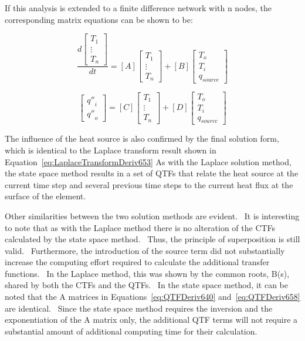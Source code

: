 If this analysis is extended to a finite difference network with n nodes, the corresponding matrix equations can be shown to be:

\begin{equation}
\frac{{d\left[ {\begin{array}{*{20}{c}}{{T_1}}\\ \vdots \\ {{T_n}}\end{array}} \right]}}{{dt}} = \left[ A \right]\left[ {\begin{array}{*{20}{c}}{{T_1}}\\ \vdots \\ {{T_n}}\end{array}} \right] + \left[ B \right]\left[ {\begin{array}{*{20}{c}}{{T_o}}\\ {{T_i}}\\ {{q_{source}}}\end{array}} \right]
\end{equation}

\begin{equation}
\left[ {\begin{array}{*{20}{c}}{{{q''}_i}}\\ {{{q''}_o}}\end{array}} \right] = \left[ C \right]\left[ {\begin{array}{*{20}{c}}{{T_1}}\\ \vdots \\ {{T_n}}\end{array}} \right] + \left[ D \right]\left[ {\begin{array}{*{20}{c}}{{T_o}}\\ {{T_i}}\\ {{q_{source}}}\end{array}} \right]
\end{equation}

The influence of the heat source is also confirmed by the final solution form, which is identical to the Laplace transform result shown in Equation~\ref{eq:LaplaceTransformDeriv653} As with the Laplace solution method, the state space method results in a set of QTFs that relate the heat source at the current time step and several previous time steps to the current heat flux at the surface of the element.

Other similarities between the two solution methods are evident.~ It is interesting to note that as with the Laplace method there is no alteration of the CTFs calculated by the state space method.~ Thus, the principle of superposition is still valid.~ Furthermore, the introduction of the source term did not substantially increase the computing effort required to calculate the additional transfer functions.~ In the Laplace method, this was shown by the common roots, B(s), shared by both the CTFs and the QTFs.~ In the state space method, it can be noted that the A matrices in Equations~\ref{eq:QTFDeriv640} and~\ref{eq:QTFDeriv658} are identical.~ Since the state space method requires the inversion and the exponentiation of the A matrix only, the additional QTF terms will not require a substantial amount of additional computing time for their calculation.

